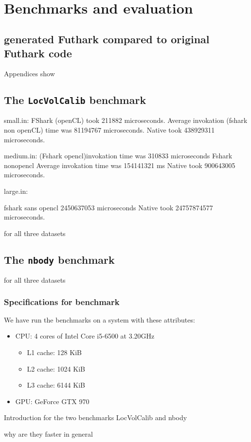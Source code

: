 \chapter{Benchmarks and evaluation}
\section*{\fshark{} generated Futhark compared to original Futhark code}

Appendices show 
\section*{The \texttt{LocVolCalib} benchmark}
small.in:
FShark (openCL) took 211882 microseconds.
Average invokation (fshark non openCL) time was 81194767 microseconds.
Native took 438929311 microseconds.

medium.in:
(Fshark opencl)invokation time was 310833 microseconds
Fshark nonopencl Average invokation time was 154141321 ms
Native took 900643005 microseconds.

large.in:

fshark sans opencl 2450637053 microseconds
Native took 24757874577 microseconds.


for all three datasets


\section*{The \texttt{nbody} benchmark}

for all three datasets


\subsection*{Specifications for benchmark}
We have run the benchmarks on a system with these attributes:
\begin{itemize}
\item CPU: 4 cores of Intel Core i5-6500 at 3.20GHz
  \begin{itemize}
  \item L1 cache: 128 KiB 
  \item L2 cache: 1024 KiB 
  \item L3 cache: 6144 KiB 
  \end{itemize}
\item GPU: GeForce GTX 970
\end{itemize}


Introduction for the two benchmarks LocVolCalib and nbody



why are they faster in general



